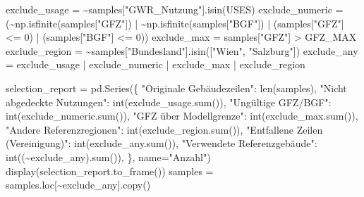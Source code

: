 \documentclass[
  ngerman,
  a4paper,
  DIV=11]{scrreprt}
\newenvironment{Shaded}{\begin{snugshade}}{\end{snugshade}}
\newcommand{\BuiltInTok}[1]{\textcolor[rgb]{0.00,0.23,0.31}{#1}}
\newcommand{\DecValTok}[1]{\textcolor[rgb]{0.68,0.00,0.00}{#1}}
\newcommand{\NormalTok}[1]{\textcolor[rgb]{0.00,0.23,0.31}{#1}}
\newcommand{\OperatorTok}[1]{\textcolor[rgb]{0.37,0.37,0.37}{#1}}
\newcommand{\StringTok}[1]{\textcolor[rgb]{0.13,0.47,0.30}{#1}}
\begin{document}
\begin{Shaded}
\begin{Highlighting}[]
\NormalTok{exclude\_usage }\OperatorTok{=} \OperatorTok{\textasciitilde{}}\NormalTok{samples[}\StringTok{"GWR\_Nutzung"}\NormalTok{].isin(USES)}
\NormalTok{exclude\_numeric }\OperatorTok{=}\NormalTok{ (}\OperatorTok{\textasciitilde{}}\NormalTok{np.isfinite(samples[}\StringTok{"GFZ"}\NormalTok{]) }\OperatorTok{|} \OperatorTok{\textasciitilde{}}\NormalTok{np.isfinite(samples[}\StringTok{"BGF"}\NormalTok{])}
                   \OperatorTok{|}\NormalTok{ (samples[}\StringTok{"GFZ"}\NormalTok{] }\OperatorTok{\textless{}=} \DecValTok{0}\NormalTok{) }\OperatorTok{|}\NormalTok{ (samples[}\StringTok{"BGF"}\NormalTok{] }\OperatorTok{\textless{}=} \DecValTok{0}\NormalTok{))}
\NormalTok{exclude\_max }\OperatorTok{=}\NormalTok{ samples[}\StringTok{"GFZ"}\NormalTok{] }\OperatorTok{\textgreater{}}\NormalTok{ GFZ\_MAX}
\NormalTok{exclude\_region }\OperatorTok{=} \OperatorTok{\textasciitilde{}}\NormalTok{samples[}\StringTok{"Bundesland"}\NormalTok{].isin([}\StringTok{"Wien"}\NormalTok{, }\StringTok{"Salzburg"}\NormalTok{])}
\NormalTok{exclude\_any }\OperatorTok{=}\NormalTok{ exclude\_usage }\OperatorTok{|}\NormalTok{ exclude\_numeric }\OperatorTok{|}\NormalTok{ exclude\_max }\OperatorTok{|}\NormalTok{ exclude\_region}

\NormalTok{selection\_report }\OperatorTok{=}\NormalTok{ pd.Series(\{}
    \StringTok{"Originale Gebäudezeilen"}\NormalTok{: }\BuiltInTok{len}\NormalTok{(samples),}
    \StringTok{"Nicht abgedeckte Nutzungen"}\NormalTok{: }\BuiltInTok{int}\NormalTok{(exclude\_usage.}\BuiltInTok{sum}\NormalTok{()),}
    \StringTok{"Ungültige GFZ/BGF"}\NormalTok{: }\BuiltInTok{int}\NormalTok{(exclude\_numeric.}\BuiltInTok{sum}\NormalTok{()),}
    \StringTok{"GFZ über Modellgrenze"}\NormalTok{: }\BuiltInTok{int}\NormalTok{(exclude\_max.}\BuiltInTok{sum}\NormalTok{()),}
    \StringTok{"Andere Referenzregionen"}\NormalTok{: }\BuiltInTok{int}\NormalTok{(exclude\_region.}\BuiltInTok{sum}\NormalTok{()),}
    \StringTok{"Entfallene Zeilen (Vereinigung)"}\NormalTok{: }\BuiltInTok{int}\NormalTok{(exclude\_any.}\BuiltInTok{sum}\NormalTok{()),}
    \StringTok{"Verwendete Referenzgebäude"}\NormalTok{: }\BuiltInTok{int}\NormalTok{((}\OperatorTok{\textasciitilde{}}\NormalTok{exclude\_any).}\BuiltInTok{sum}\NormalTok{()),}
\NormalTok{\}, name}\OperatorTok{=}\StringTok{"Anzahl"}\NormalTok{)}
\NormalTok{display(selection\_report.to\_frame())}
\NormalTok{samples }\OperatorTok{=}\NormalTok{ samples.loc[}\OperatorTok{\textasciitilde{}}\NormalTok{exclude\_any].copy()}
\end{Highlighting}
\end{Shaded}
\end{document}
